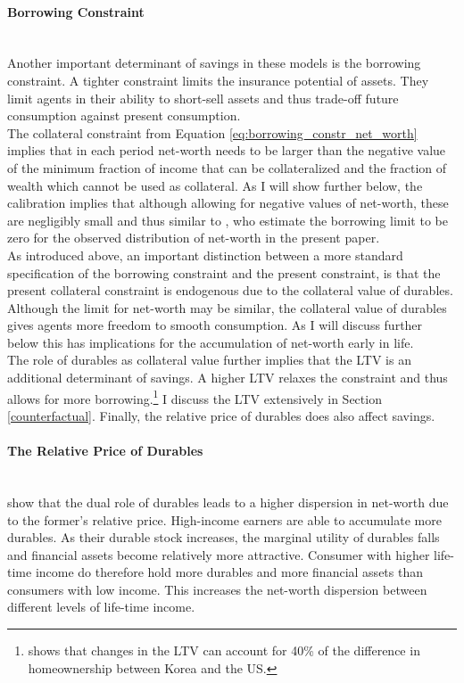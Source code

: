 \documentclass[a4paper,12pt,legno]{article}
\newcommand{\myparagraph}[1]{\paragraph{#1}\mbox{}\\}
\begin{document}
\myparagraph{Borrowing Constraint} Another important determinant of savings in these models is the borrowing constraint. A tighter constraint limits the insurance potential of assets. They limit agents in their ability to short-sell assets and thus trade-off future consumption against present consumption. \\ 
The collateral constraint from Equation \ref{eq:borrowing_constr_net_worth} implies that in each period net-worth needs to be larger than the negative value of the minimum fraction of income that can be collateralized and the fraction of wealth which cannot be used as collateral. As I will show further below, the calibration implies that although allowing for negative values of net-worth, these are negligibly small and thus similar to \cite{hintermaier2011}, who estimate the borrowing limit to be zero for the observed distribution of net-worth in the present paper. 
\\ 
As introduced above, an important distinction between a more standard specification of the borrowing constraint and the present constraint, is that the present collateral constraint is endogenous due to the collateral value of durables. Although the limit for net-worth may be similar, the collateral value of durables gives agents more freedom to smooth consumption. As I will discuss further below this has implications for the accumulation of net-worth early in life.\\ The role of durables as collateral value further implies that the LTV is an additional determinant of savings. A higher LTV relaxes the constraint and thus allows for more borrowing.\footnote{\cite{cho2012accounting} shows that changes in the LTV can account for 40\% of the difference in homeownership between Korea and the US.} I discuss the LTV extensively in Section \ref{counterfactual}.
Finally, the relative price of durables does also affect savings.

\myparagraph{The Relative Price of Durables} \cite{FV&K2011} show that the dual role of durables leads to a higher dispersion in net-worth due to the former's relative price. High-income earners are able to accumulate more durables. As their durable stock increases, the marginal utility of durables falls and financial assets become relatively more attractive. Consumer with higher life-time income do therefore hold more durables and more financial assets than consumers with low income. This increases the net-worth dispersion between different levels of life-time income. 
\end{document}
